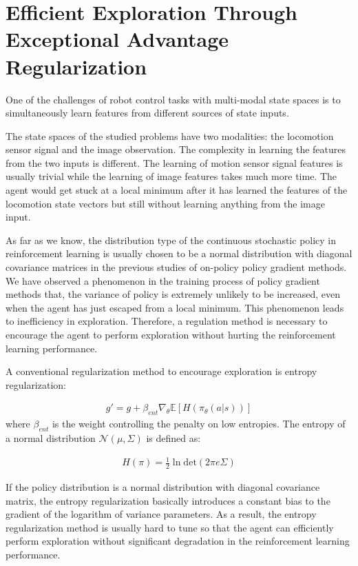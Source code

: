 \section{Efficient Exploration Through Exceptional Advantage Regularization}\label{sec_method_expadv_reg}
One of the challenges of robot control tasks with multi-modal state spaces is to simultaneously learn features from different sources of state inputs.

The state spaces of the studied problems have two modalities: the locomotion sensor signal and the image observation. The complexity in learning the features from the two inputs is different. The learning of motion sensor signal features is usually trivial while the learning of image features takes much more time. The agent would get stuck at a local minimum after it has learned the features of the locomotion state vectors but still without learning anything from the image input.

As far as we know, the distribution type of the continuous stochastic policy in reinforcement learning is usually chosen to be a normal distribution with diagonal covariance matrices in the previous studies of on-policy policy gradient methods. We have observed a phenomenon in the training process of policy gradient methods that, the variance of policy is extremely unlikely to be increased, even when the agent has just escaped from a local minimum. This phenomenon leads to inefficiency in exploration. Therefore, a regulation method is necessary to encourage the agent to perform exploration without hurting the reinforcement learning performance.

A conventional regularization method to encourage exploration is entropy regularization:

\begin{align}
g' = g +\beta_{ent}\nabla_\theta \mathbb{E}[ H(\pi_\theta(a|s)) ]
\end{align}
where $\beta_{ent}$ is the weight controlling the penalty on low entropies.
The entropy of a normal distribution $\mathcal{N}(\mu,\Sigma)$ is defined as:

\begin{align}
	H(\pi) =  \frac{1}{2} \ln \mathrm{det}(2\pi e \Sigma)
\end{align}

If the policy distribution is a normal distribution with diagonal covariance matrix, the entropy regularization basically introduces a constant bias to the gradient of the logarithm of variance parameters. As a result, the entropy regularization method is usually hard to tune so that the agent can efficiently perform exploration without significant degradation in the reinforcement learning performance.

